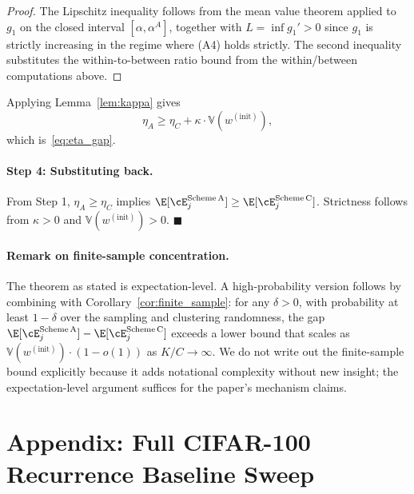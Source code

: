 \begin{proof}
The Lipschitz inequality follows from the mean value theorem applied to $g_1$ on the closed interval $[\alpha, \alpha^A]$, together with $L = \inf g_1' > 0$ since $g_1$ is strictly increasing in the regime where (A4) holds strictly. The second inequality substitutes the within-to-between ratio bound from the within/between computations above.
\end{proof}

Applying Lemma~\ref{lem:kappa} gives
\[
\eta_A \ge \eta_C + \kappa \cdot \mathbb{V}(w^{(\mathrm{init})}),
\]
which is~\eqref{eq:eta_gap}.

\paragraph{Step 4: Substituting back.}
From Step 1, $\eta_A \ge \eta_C$ implies $\E[\cE_j^{\mathrm{Scheme\,A}}] \ge \E[\cE_j^{\mathrm{Scheme\,C}}]$. Strictness follows from $\kappa > 0$ and $\mathbb{V}(w^{(\mathrm{init})}) > 0$. $\blacksquare$

\paragraph{Remark on finite-sample concentration.}
The theorem as stated is expectation-level. A high-probability version follows by combining with Corollary~\ref{cor:finite_sample}: for any $\delta > 0$, with probability at least $1 - \delta$ over the sampling and clustering randomness, the gap $\E[\cE_j^{\mathrm{Scheme\,A}}] - \E[\cE_j^{\mathrm{Scheme\,C}}]$ exceeds a lower bound that scales as $\mathbb{V}(w^{(\mathrm{init})}) \cdot (1 - o(1))$ as $K/C \to \infty$. We do not write out the finite-sample bound explicitly because it adds notational complexity without new insight; the expectation-level argument suffices for the paper's mechanism claims.

\section*{Appendix: Full CIFAR-100 Recurrence Baseline Sweep}
\label{app:recurrence_full_sweep}

